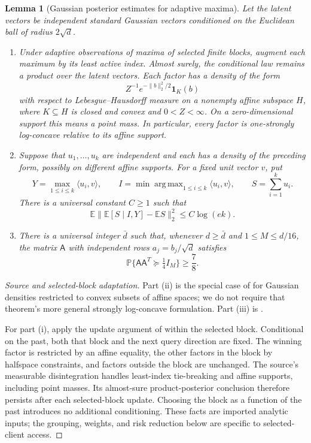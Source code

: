 \documentclass[11pt]{article}
\numberwithin{equation}{section}
\newtheorem{lemma}[lemma]{Lemma}
\theoremstyle{remark}
\theoremstyle{definition}
\newcommand{\E}{\mathbb{E}}
\newcommand{\Pp}{\mathbb{P}}
\newcommand{\ip}[2]{\langle #1,#2\rangle}
\newcommand{\norm}[1]{\lVert #1\rVert_2}
\newcommand{\ind}{\mathbf{1}}
\DeclareMathOperator*{\argmax}{arg\,max}
\begin{document}
\begin{lemma}[Gaussian posterior estimates for adaptive maxima]
\label{lem:posterior-toolkit}
Let the latent vectors be independent standard Gaussian vectors
conditioned on the Euclidean ball of radius $2\sqrt d$.
\begin{enumerate}[label=(\roman*)]
\item Under adaptive observations of maxima of selected finite blocks,
augment each maximum by its least active index. Almost surely, the
conditional law remains a product over the latent vectors. Each factor
has a density of the form
\[
  Z^{-1}e^{-\norm b^2/2}\ind_K(b)
\]
with respect to Lebesgue--Hausdorff measure on a nonempty affine
subspace $H$, where $K\subseteq H$ is closed and convex and
$0<Z<\infty$. On a zero-dimensional support this means a point mass.
In particular, every factor is one-strongly log-concave relative to
its affine support.
\item Suppose that $u_1,\ldots,u_k$ are independent and each has a
density of the preceding form, possibly on different affine supports.
For a fixed unit vector $v$, put
\[
 Y=\max_{1\le i\le k}\ip{u_i}v,
 \qquad I=\min\argmax_{1\le i\le k}\ip{u_i}v,
 \qquad S=\sum_{i=1}^k u_i.
\]
There is a universal constant $C\ge1$ such that
\[
 \E\norm{\E[S\mid I,Y]-\E S}^2\le C\log(ek).
\]
\item There is a universal integer $\bar d$ such that, whenever
$d\ge\bar d$ and $1\le M\le d/16$, the matrix $\mathsf A$ with
independent rows $a_j=b_j/\sqrt d$ satisfies
\[
 \Pp\{\mathsf A\mathsf A^T\succeq\tfrac14I_M\}\ge\frac78.
\]
\end{enumerate}
\end{lemma}

\begin{proof}[Source and selected-block adaptation]
Part (ii) is the special case of \cite[Theorem 14]{zzql2026} for
Gaussian densities restricted to convex subsets of affine spaces;
we do not require that theorem's more general strongly log-concave
formulation. Part (iii) is \cite[Theorem 40]{zzql2026}.

For part (i), apply the update argument of
\cite[Lemma 13]{zzql2026} within the selected block. Conditional on the
past, both that block and the next query direction are fixed.
The winning factor is restricted by an affine equality, the other
factors in the block by halfspace constraints, and factors outside the
block are unchanged. The source's measurable disintegration handles
least-index tie-breaking and affine supports, including point masses.
Its almost-sure product-posterior conclusion therefore persists after
each selected-block update. Choosing the block as a function of the
past introduces no additional conditioning. These facts are imported
analytic inputs; the grouping, weights, and risk reduction below are
specific to selected-client access.
\end{proof}
\end{document}

